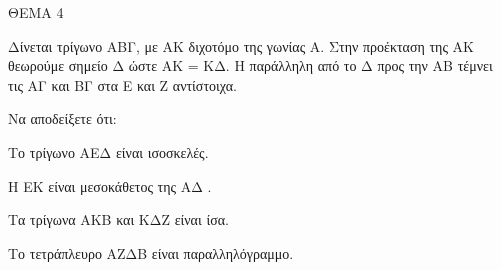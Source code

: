 
ΘΕΜΑ 4

Δίνεται τρίγωνο ΑΒΓ, με ΑΚ διχοτόμο της γωνίας Α. Στην προέκταση της ΑΚ θεωρούμε σημείο Δ ώστε ΑΚ = ΚΔ. Η παράλληλη από το Δ προς την ΑΒ τέμνει τις ΑΓ και ΒΓ στα Ε και Ζ αντίστοιχα.

Να αποδείξετε ότι:

\begin{alist}
\item Το τρίγωνο ΑΕΔ είναι ισοσκελές. 

\item Η ΕΚ είναι μεσοκάθετος της ΑΔ . 

\item Τα τρίγωνα ΑΚΒ και ΚΔΖ είναι ίσα. 

\item Το τετράπλευρο ΑΖΔΒ είναι παραλληλόγραμμο. 


\end{alist}
